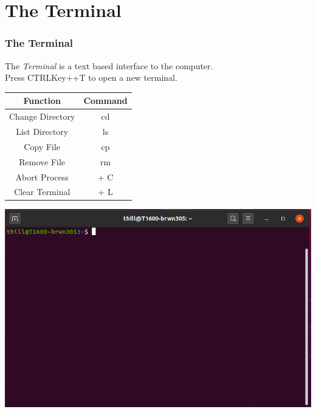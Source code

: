 \documentclass[fleqn]{beamer} %
\newcommand{\sectiontitleIV}{The Terminal}
\begin{document}
\section{\sectiontitleIV}	
	\begin{frame}[label=sectionIV] \small
		\frametitle{\sectiontitleIV}    
          The {\it Terminal} is a text based interface to the computer.\vspace{2mm}\\ Press CTRLKey+\ALTKey+T to open a new terminal. \vspace{3mm}\\      
                \begin{multicols}{2}
		



		\renewcommand{\arraystretch}{1.4}
		\begin{tabular}{|c|c|}\hline
				Function & Command \\ \hline
			 Change Directory & cd  \\ 
			List Directory & ls \\  
			Copy File& cp \\ 
			Remove File& rm  \\ 
			Abort Process& \CTRLKey + C  \\ 
			Clear Terminal& \CTRLKey + L  \\ \hline
				
		\end{tabular}
			
		\hspace{10mm}\includegraphics[scale=.20]{ubuntu_terminal.png}  
       	       
        \end{multicols}

       	                       
                
		\end{frame}
		
\end{document}
